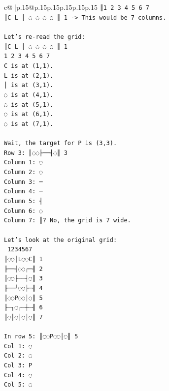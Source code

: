 \documentclass{article}
\begin{document}
{\begin{supertabular}{c@{$\;$}|p{.15\linewidth}@{}p{.15\linewidth}p{.15\linewidth}p{.15\linewidth}p{.15\linewidth}p{.15\linewidth}}
{{{\texttt{║1 2 3 4 5 6 7} \\
\texttt{║C L │ ◌ ◌ ◌ ◌ ║ 1 {-}> This would be 7 columns.} \\
\\ 
\texttt{Let's re{-}read the grid:} \\
\texttt{║C L │ ◌ ◌ ◌ ◌ ║ 1} \\
\texttt{1 2 3 4 5 6 7} \\
\texttt{C is at (1,1).} \\
\texttt{L is at (2,1).} \\
\texttt{│ is at (3,1).} \\
\texttt{◌ is at (4,1).} \\
\texttt{◌ is at (5,1).} \\
\texttt{◌ is at (6,1).} \\
\texttt{◌ is at (7,1).} \\
\\ 
\texttt{Wait, the target for P is (3,3).} \\
\texttt{Row 3: ║◌◌├──┤◌║ 3} \\
\texttt{Column 1: ◌} \\
\texttt{Column 2: ◌} \\
\texttt{Column 3: ─} \\
\texttt{Column 4: ─} \\
\texttt{Column 5: ┤} \\
\texttt{Column 6: ◌} \\
\texttt{Column 7: ║? No, the grid is 7 wide.} \\
\\ 
\texttt{Let's look at the original grid:} \\
\texttt{ 1234567} \\
\texttt{║◌◌│L◌◌C║ 1} \\
\texttt{╟──┤◌◌┌─╢ 2} \\
\texttt{║◌◌├──┤◌║ 3} \\
\texttt{╟──┘◌◌├─╢ 4} \\
\texttt{║◌◌P◌◌│◌║ 5} \\
\texttt{╟─┐◌┌─┼─╢ 6} \\
\texttt{║◌│◌│◌│◌║ 7} \\
\\ 
\texttt{In row 5: ║◌◌P◌◌│◌║ 5} \\
\texttt{Col 1: ◌} \\
\texttt{Col 2: ◌} \\
\texttt{Col 3: P} \\
\texttt{Col 4: ◌} \\
\texttt{Col 5: ◌} \\
}}}
\end{supertabular}}
\end{document}
